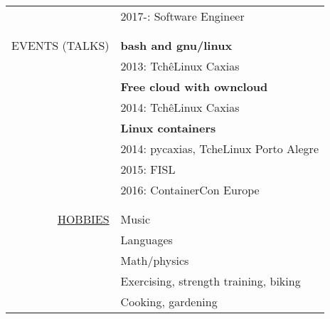\begin{center}
\begin{tabular}{rl}
    & 2017-: Software Engineer
    \\\\ \hline \\
    \uppercase{Events (talks)}
    & \textbf{bash and gnu/linux} \\
    & 2013: TchêLinux Caxias \\
    & \textbf{Free cloud with owncloud} \\
    & 2014: TchêLinux Caxias \\
    & \textbf{Linux containers} \\
    & 2014: pycaxias, TcheLinux Porto Alegre \\
    & 2015: FISL \\
    & 2016: ContainerCon Europe
    \\\\ \hline \\
    \hyperref[sec:etc]{\uppercase{Hobbies}}
    & Music \\
    & Languages \\
    & Math/physics \\
    & Exercising, strength training, biking \\
    & Cooking, gardening
\end{tabular}

\end{center}
